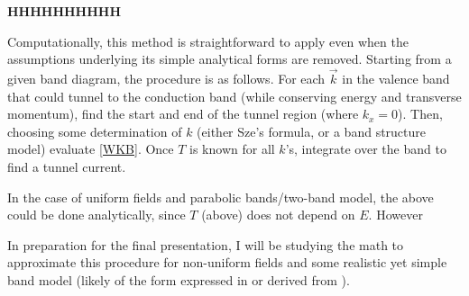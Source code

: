 \textbf{HHHHHHHHHH}

Computationally, this method is straightforward to apply even when the assumptions underlying its simple analytical forms are removed.  Starting from a given band diagram, the procedure is as follows.  For each $\vec{k}$ in the valence band that could tunnel to the conduction band (while conserving energy and transverse momentum), find the start and end of the tunnel region (where $k_x=0$).  Then, choosing some determination of $k$ (either Sze's formula, or a band structure model) evaluate \ref{WKB}.  Once $T$ is known for all $k$'s, integrate over the band to find a tunnel current.



In the case of uniform fields and parabolic bands/two-band model, the above could be done analytically, since $T$ (above) does not depend on $E$.  However


In preparation for the final presentation, I will be studying the math to approximate this procedure for non-uniform fields and some realistic yet simple band model (likely of the form expressed in \cite{Guan_2011} or derived from \cite{Piprek}).
